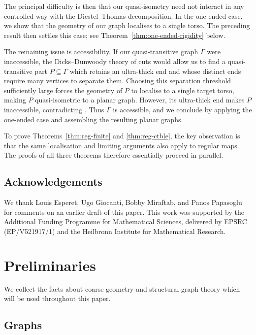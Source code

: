 \documentclass[a4paper]{amsart}
\begin{document}
The principal difficulty is then that our quasi-isometry need not interact in any controlled way with the Diestel--Thomas decomposition. In the one-ended case, we show that the geometry of our graph localises to a single torso. The preceding result then settles this case; see Theorem~\ref{thm:one-ended-rigidity} below.

The remaining issue is accessibility. If our quasi-transitive graph $\Gamma$ were inaccessible, the Dicks--Dunwoody theory of cuts \cite{dicks1989groups} would allow us to find a quasi-transitive part $P \subseteq \Gamma$ which retains an ultra-thick end and whose distinct ends require many vertices to separate them. Choosing this separation threshold sufficiently large forces the geometry of $P$ to localise to a single target torso, making $P$ quasi-isometric to a planar graph. However, its ultra-thick end makes $P$ inaccessible, contradicting \cite[Thm.~A]{macmanus2023accessibility}. Thus $\Gamma$ is accessible, and we conclude by applying the one-ended case and assembling the resulting planar graphs.

To prove Theorems~\ref{thm:reg-finite} and \ref{thm:reg-ctble}, the key observation is that the same localisation and limiting arguments also apply to regular maps. The proofs of all three theorems therefore essentially proceed in parallel.  




\subsection*{Acknowledgements}

We thank Louis Esperet, Ugo Giocanti, Bobby Miraftab, and Panos Papasoglu for comments on an earlier draft of this paper. 
This work was supported by the Additional Funding Programme for Mathematical Sciences, delivered by EPSRC (EP/V521917/1) and the Heilbronn Institute for Mathematical Research.



\section{Preliminaries}\label{sec:preliminaries}

We collect the facts about coarse geometry and structural graph theory which will be used throughout this paper.

\subsection{Graphs}
\end{document}
